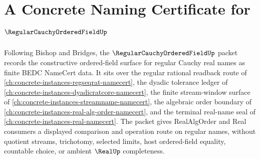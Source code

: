 \chapter{A Concrete Naming Certificate for $\RegularCauchyOrderedFieldUp$}
\label{ch:concrete-instances-regular-cauchy-ordered-field-namecert}

Following Bishop and Bridges, the $\RegularCauchyOrderedFieldUp$ packet records the constructive ordered-field surface for regular Cauchy real names as finite BEDC NameCert data. It sits over the regular rational readback route of \autoref{ch:concrete-instances-regseqrat-namecert}, the dyadic tolerance ledger of \autoref{ch:concrete-instances-dyadicratcore-namecert}, the finite stream-window surface of \autoref{ch:concrete-instances-streamname-namecert}, the algebraic order boundary of \autoref{ch:concrete-instances-real-alg-order-namecert}, and the terminal real-name seal of \autoref{ch:concrete-instances-real-namecert}. The packet gives RealAlgOrder and Real consumers a displayed comparison and operation route on regular names, without quotient streams, trichotomy, selected limits, host ordered-field equality, countable choice, or ambient $\RealUp$ completeness.

